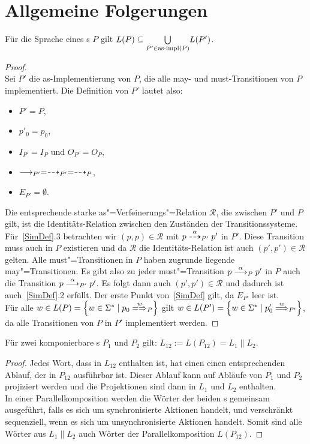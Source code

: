 \section{Allgemeine Folgerungen}
\label{saetzeKapitel}

\begin{Prop}
  \label{LImpProp}
  Für die Sprache eines \MEIO{}s $P$ gilt $L(P) \subseteq \underset{P'\in\mathrm{as}\text{-}\mathrm{impl}
  (P)}{\bigcup} L(P')$.
\end{Prop}
\begin{proof}\mbox{}\\
  Sei $P'$ die as-Implementierung von $P$, die alle may- und must-Transitionen
  von $P$ implementiert. Die Definition von $P'$ lautet also:
  \begin{itemize}
    \item $P'=P$,
    \item $p'_0=p_0$,
    \item $I_{P'}=I_P$ und $O_{P'}=O_P$,
    \item $\must _{P'} =\may _{P'} = \may _P$,
    \item $E_{P'}=\emptyset$.
  \end{itemize}
  Die entsprechende starke as"=Verfeinerungs"=Relation $\mathcal{R}$, die
  zwischen $P'$ und $P$ gilt, ist die Identitäts-Relation zwischen den
  Zuständen der Transitionssysteme. Für~\ref{SimDef}.3 betrachten wir $(p,p)
  \in\mathcal{R}$ mit $p\may[\alpha]_{P'} p'$ in $P'$. Diese Transition muss
  auch in $P$ existieren und da $\mathcal{R}$ die Identitäts-Relation ist auch
  $(p',p')\in\mathcal{R}$ gelten. Alle must"=Transitionen in $P$ haben zugrunde
  liegende may"=Transitionen. Es gibt also zu jeder must"=Transition $p
  \must[\alpha]_P p'$ in $P$ auch die Transition $p\must[\alpha]_{P'} p'$. Es
  folgt dann auch $(p',p') \in \mathcal{R}$ und dadurch ist auch~\ref{SimDef}.2
  erfüllt. Der erste Punkt von~\ref{SimDef} gilt, da $E_{P'}$ leer ist.\\
  Für alle $w\in L(P) = \left\{w\in \Sigma ^* \mid p_0\weakmay[w]_P\right\}$
  gilt $w\in L(P') = \left\{w\in \Sigma ^* \mid p'_0 \weakmust[w]_{P'}
  \right\}$, da alle Transitionen von $P$ in $P'$ implementiert werden.
\end{proof}

\begin{Prop}
  \label{LParallelProp}
  Für zwei komponierbare \MEIO{}s $P_1$ und $P_2$ gilt: $L_{12} := L(P_{12}) =
  L_1\|L_2$.
\end{Prop}
\begin{proof}
  Jedes Wort, dass in $L_{12}$ enthalten ist, hat einen einen entsprechenden
  Ablauf, der in $P_{12}$ ausführbar ist. Dieser Ablauf kann auf Abläufe von
  $P_1$ und $P_2$ projiziert werden und die Projektionen sind dann in $L_1$ und
  $L_2$ enthalten.\\
  In einer Parallelkomposition werden die Wörter der beiden \MEIO{}s gemeinsam
  ausgeführt, falls es sich um synchronisierte Aktionen handelt, und
  verschränkt sequenziell, wenn es sich um unsynchronisierte Aktionen handelt.
  Somit sind alle Wörter aus $L_1\|L_2$ auch Wörter der Parallelkomposition
  $L(P_{12})$.
\end{proof}

